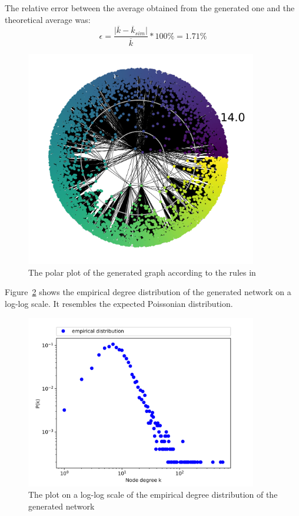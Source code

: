 \documentclass[a4paper]{article}
\begin{document}
The relative error between the average obtained from the generated one and the theoretical average was:
\begin{equation}
\epsilon = \frac{\vert \overline{k} - \overline{k}_{sim} \vert}{\overline{k} } * 100 \% = 1.71 \%
\end{equation}

\begin{figure}[H]
    \centering
    \includegraphics[width=0.9\textwidth]{figures/result_graph.png}
    \caption{The polar plot of the generated graph according to the rules in \cite{HyperbolicGeoNetworks}}
    \label{fig:graph}
\end{figure}


Figure~\ref{fig:graph_stats} shows the empirical degree distribution of the generated network on a log-log scale. It resembles the expected Poissonian distribution.
 
\begin{figure}[H]
    \centering
    \includegraphics[width=0.9\textwidth]{figures/result_graph_stats.png}
    \caption{The plot on a log-log scale of the empirical degree distribution of the generated network}
    \label{fig:graph_stats}
\end{figure}
\end{document}
